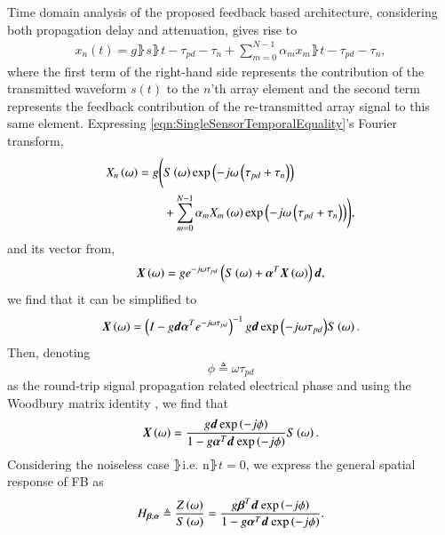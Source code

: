 Time domain analysis of the proposed feedback based architecture, considering both propagation delay and attenuation, gives rise to
\begin{equation}
    \label{eqn:SingleSensorTemporalEquality}
        \begin{split}
            x_{n}(t) = g\rBrace{s\rBrace{t-\tau_{pd}-\tau_{n}}
            +\sum_{m=0}^{N-1}{\alpha_{m}x_{m}\rBrace{t-\tau_{pd}-\tau_{n}}}},
        \end{split}
\end{equation}
where the first term of the right-hand side represents the contribution of the transmitted waveform $s(t)$ to the $n$'th array element and the second term represents the feedback contribution of the re-transmitted array signal to this same element.
Expressing \eqref{eqn:SingleSensorTemporalEquality}'s Fourier transform,
\begin{equation}
    \label{eqn_singleSensorFourier}
        \begin{split}
            \F{x}_{n}\rBrace{\omega} =
            g\Bigg( & \F{s}\rBrace{\omega}
            \exp\rBrace{-j\omega\rBrace{\tau_{pd}+\tau_{n}}}
            \\&+\sum_{m=0}^{N-1}
            {
            \alpha_{m}\omegaB\F{x}_{m}\rBrace{\omega}
            \exp\rBrace{-j\omega\rBrace{\tau_{pd}+\tau_{n}}}
            }\Bigg),
        \end{split}
\end{equation}
and its vector from,
$$
\F{\vx}\rBrace{\omega} = ge^{-j\omega\tau_{pd}} \rBrace{\F{s}\rBrace{\omega}+\vAlphaT \F{\vx}\rBrace{\omega}}\vd,
$$
we find that it can be simplified to
$$
\F{\vx}\rBrace{\omega} =\rBrace{I-g\vd\vAlphaT{}e^{-j\omega\tau_{pd}}}^{-1}g\vd\exp{\rBrace{-j\omega\tau_{pd}}}\F{s}\rBrace{\omega}.
$$
Then, denoting
\[
\phi\triangleq\omega\tau_{pd}
\]
as the round-trip signal propagation related electrical phase and using the Woodbury matrix identity \cite{woodbury1950inverting}, we find that
$$
\F{\vx}\rBrace{\omega}
=
\frac{    
g\vd\exp{\rBrace{-j\phi}}
}{
1 - g\aTd{}\exp{\rBrace{-j\phi}}
}\F{s}\rBrace{\omega}.
$$
Considering the noiseless case $\rBrace{\text{i.e. n}\rBrace{t}=0}$,
we express the general spatial response of FB as 
\begin{equation}
\label{eqn:GeneralFeedbackTransferFunction}
\Hba
\triangleq
\frac{\F{z}\rBrace{\omega}}{\F{s}\rBrace{\omega}} 
=
\frac{    
g\bTd{}\exp\rBrace{-j\phi}
}{
1 - g\aTd{}\exp\rBrace{-j\phi}
}.
\end{equation}
